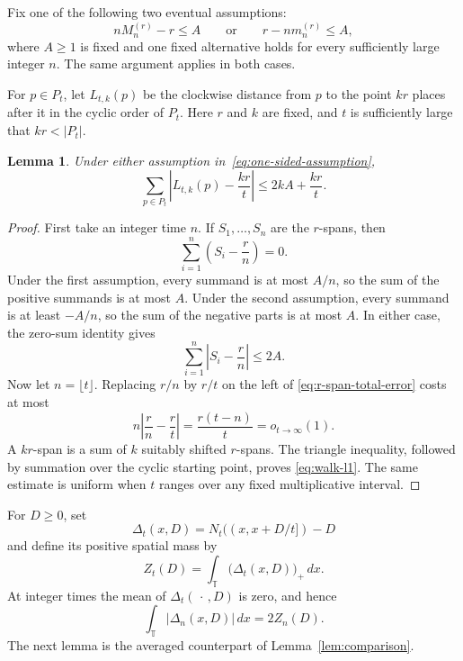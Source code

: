 \documentclass[11pt]{article}
\newtheorem{lemma}[theorem]{Lemma}
\theoremstyle{remark}
\numberwithin{equation}{section}
\newcommand{\T}{\mathbb{T}}
\begin{document}
Fix one of the following two eventual assumptions:
\begin{equation}\label{eq:one-sided-assumption}
  nM_n^{(r)}-r\leq A
  \qquad\text{or}\qquad
  r-nm_n^{(r)}\leq A,
\end{equation}
where $A\geq1$ is fixed and one fixed alternative holds for every
sufficiently large integer $n$. The same argument applies in both cases.

For $p\in P_t$, let $L_{t,k}(p)$ be the clockwise distance from $p$ to the
point $kr$ places after it in the cyclic order of $P_t$. Here $r$ and $k$
are fixed, and $t$ is sufficiently large that $kr<|P_t|$.
\begin{lemma}\label{lem:one-sided-span-l1}
Under either assumption in~\eqref{eq:one-sided-assumption},
\begin{equation}\label{eq:walk-l1}
  \sum_{p\in P_t}
  \left|L_{t,k}(p)-\frac{kr}{t}\right|
  \leq 2kA+\frac{kr}{t}.
\end{equation}
\end{lemma}
\begin{proof}
First take an integer time $n$. If $S_1,\ldots,S_n$ are the $r$-spans,
then
\[
  \sum_{i=1}^n\left(S_i-\frac rn\right)=0.
\]
Under the first assumption, every summand is at most $A/n$, so the sum of
the positive summands is at most $A$. Under the second assumption, every
summand is at least $-A/n$, so the sum of the negative parts is at most
$A$. In either case, the zero-sum identity gives
\begin{equation}\label{eq:r-span-total-error}
  \sum_{i=1}^n\left|S_i-\frac rn\right|\leq2A.
\end{equation}
Now let $n=\lfloor t\rfloor$. Replacing $r/n$ by $r/t$ on the left of
\eqref{eq:r-span-total-error} costs at most
\[
  n\left|\frac rn-\frac rt\right|
  =\frac{r(t-n)}t=o_{t\to\infty}(1).
\]
A $kr$-span is a sum of $k$ suitably shifted $r$-spans. The triangle
inequality, followed by summation over the cyclic starting point, proves
\eqref{eq:walk-l1}. The same estimate is uniform when $t$ ranges over any
fixed multiplicative interval.
\end{proof}

For $D\geq0$, set
\[
  \Delta_t(x,D)=N_t((x,x+D/t])-D
\]
and define its positive spatial mass by
\[
  Z_t(D)=\int_{\T}\bigl(\Delta_t(x,D)\bigr)_+\,dx.
\]
At integer times the mean of $\Delta_t(\,\cdot\,,D)$ is zero, and hence
\begin{equation}\label{eq:q-equals-2z}
  \int_{\T}|\Delta_n(x,D)|\,dx=2Z_n(D).
\end{equation}
The next lemma is the averaged counterpart of
Lemma~\ref{lem:comparison}.
\end{document}
